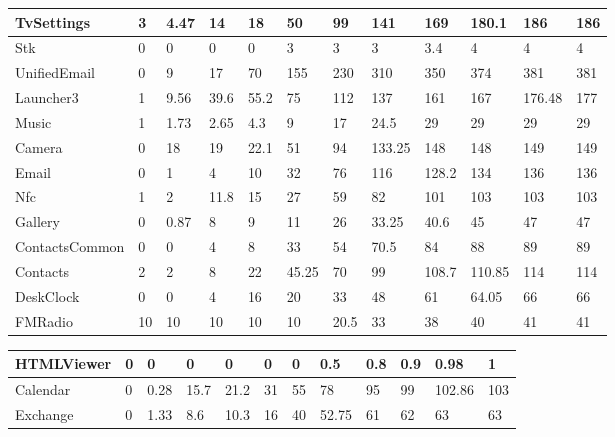 \documentclass[a4paper]{article}
\begin{document}
\begin{tabular}{|l|l|l|l|l|l|l|l|l|l|l|l|}
\hline
TvSettings&3&4.47&14&18&50&99&141&169&180.1&186&186\\
\hline
Stk&0&0&0&0&3&3&3&3.4&4&4&4\\
\hline
UnifiedEmail&0&9&17&70&155&230&310&350&374&381&381\\
\hline
Launcher3&1&9.56&39.6&55.2&75&112&137&161&167&176.48&177\\
\hline
Music&1&1.73&2.65&4.3&9&17&24.5&29&29&29&29\\
\hline
Camera&0&18&19&22.1&51&94&133.25&148&148&149&149\\
\hline
Email&0&1&4&10&32&76&116&128.2&134&136&136\\
\hline
Nfc&1&2&11.8&15&27&59&82&101&103&103&103\\
\hline
Gallery&0&0.87&8&9&11&26&33.25&40.6&45&47&47\\
\hline
ContactsCommon&0&0&4&8&33&54&70.5&84&88&89&89\\
\hline
Contacts&2&2&8&22&45.25&70&99&108.7&110.85&114&114\\
\hline
DeskClock&0&0&4&16&20&33&48&61&64.05&66&66\\
\hline
FMRadio&10&10&10&10&10&20.5&33&38&40&41&41\\
\hline
\end{tabular}
\newline
\begin{tabular}{|l|l|l|l|l|l|l|l|l|l|l|l|}
\hline
HTMLViewer&0&0&0&0&0&0&0.5&0.8&0.9&0.98&1\\
\hline
Calendar&0&0.28&15.7&21.2&31&55&78&95&99&102.86&103\\
\hline
Exchange&0&1.33&8.6&10.3&16&40&52.75&61&62&63&63\\
\hline
\end{tabular}
\end{document}

